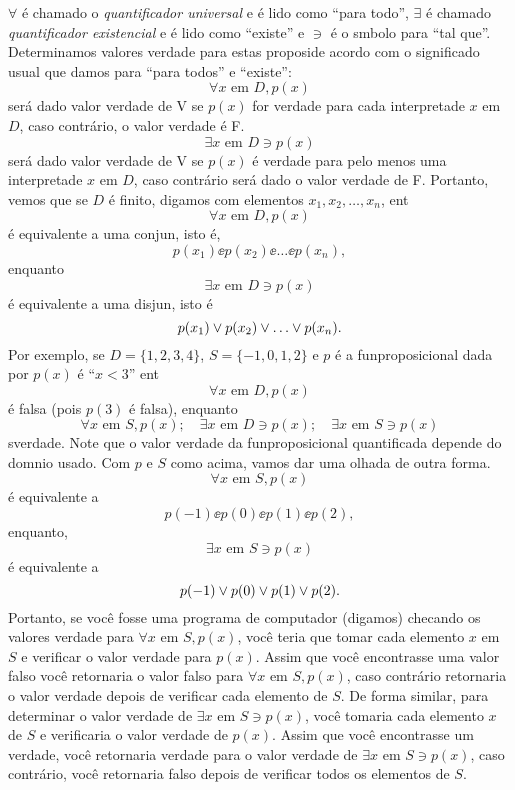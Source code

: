 $\forall$ \'e chamado o \emph{quantificador universal} e \'e lido como ``para todo'', $\exists$ \'e chamado \emph{quantificador existencial} e \'e lido como ``existe'' e $\ni$ \'e o s\ih mbolo para ``tal que''. Determinamos valores verdade para estas proposi\coes de acordo com o significado usual que damos para ``para todos'' e ``existe'':
\[
\forall x \textrm{ em } D, p(x)
\] 
ser\'a dado valor verdade de V se $p(x)$ for verdade para cada interpreta\cao de $x$ em $D$, caso contr\'ario, o valor verdade \'e F.
\[
\exists x \textrm{ em } D \ni p(x)
\] 
ser\'a dado valor verdade de V se $p(x)$ \'e verdade para pelo menos uma interpreta\cao de $x$ em $D$, caso contr\'ario ser\'a dado o valor verdade de F. Portanto, vemos que se $D$ \'e finito, digamos com elementos $x_1,x_2,\ldots,x_n$, ent\ao
\[
\forall x \textrm{ em } D, p(x)
\] 
\'e equivalente a uma conjun\caoi, isto \'e,
\[
p(x_1)\ee p(x_2)\ee \ldots \ee p(x_n),
\]
enquanto
\[
\exists x \textrm{ em } D \ni p(x)
\]
\'e equivalente a uma disjun\caoi, isto \'e
\[
p(x_1)\vee p(x_2)\vee \ldots \vee p(x_n).
\]
Por exemplo, se $D=\{1,2,3,4\}$, $S=\{-1,0,1,2\}$ e $p$ \'e a fun\cao proposicional dada por $p(x)$ \'e ``$x<3$'' ent\ao 
\[
\forall x \textrm{ em } D, p(x)
\]
\'e falsa (pois $p(3)$ \'e falsa), enquanto
\[
\forall x \textrm{ em } S, p(x); \quad \exists x \textrm{ em } D \ni p(x); \quad \exists x \textrm{ em } S \ni p(x) 
\]
s\ao verdade. Note que o valor verdade da fun\cao proposicional quantificada depende do dom\ih nio usado. Com $p$ e $S$ como acima, vamos dar uma olhada de outra forma.
\[
\forall x \textrm{ em } S, p(x)
\]
\'e equivalente a
\[
p(-1)\ee p(0)\ee p(1) \ee p(2),
\]
enquanto,
\[
\exists x \textrm{ em } S \ni p(x)
\]
\'e equivalente a
\[
p(-1)\vee p(0)\vee p(1) \vee p(2).
\]
Portanto, se voc\^e fosse uma programa de computador (digamos) checando os valores verdade para $\forall x \textrm{ em } S, p(x)$, voc\^e teria que tomar cada elemento $x$ em $S$ e verificar o valor verdade para $p(x)$. Assim que voc\^e encontrasse uma valor falso voc\^e retornaria o valor falso para $\forall x \textrm{ em } S, p(x)$, caso contr\'ario retornaria o valor verdade depois de verificar cada elemento de $S$. De forma similar, para determinar o valor verdade de $\exists x \textrm{ em } S \ni p(x)$, voc\^e tomaria cada elemento $x$ de $S$ e verificaria o valor verdade de $p(x)$. Assim que voc\^e encontrasse um verdade, voc\^e retornaria verdade para o valor verdade de $\exists x \textrm{ em } S \ni p(x)$, caso contr\'ario, voc\^e retornaria falso depois de verificar todos os elementos de $S$.


